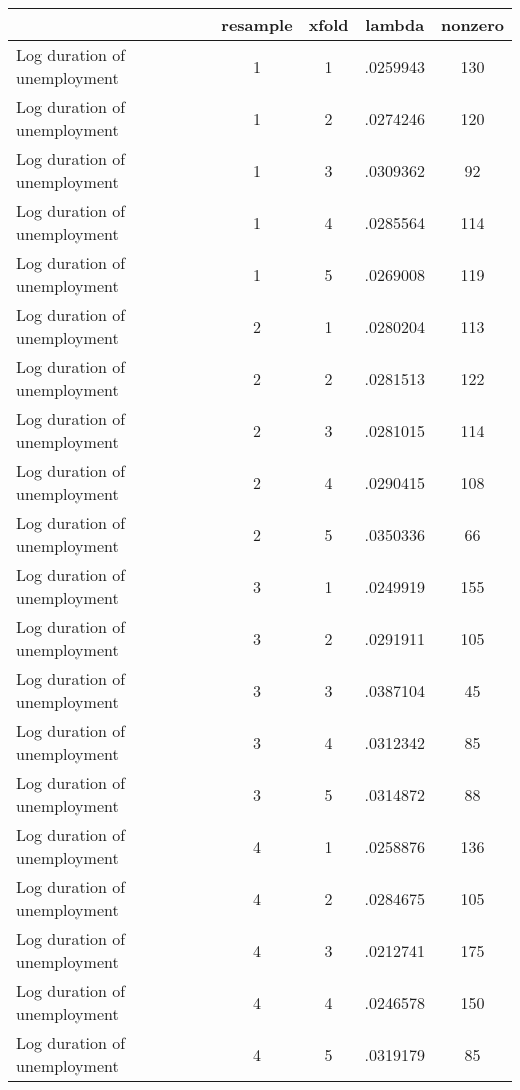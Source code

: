 \begin{tabular}{l*{4}{c}}
\hline\hline
                    &    resample&       xfold&      lambda&     nonzero\\
\hline
Log duration of unemployment&           1&           1&    .0259943&         130\\
Log duration of unemployment&           1&           2&    .0274246&         120\\
Log duration of unemployment&           1&           3&    .0309362&          92\\
Log duration of unemployment&           1&           4&    .0285564&         114\\
Log duration of unemployment&           1&           5&    .0269008&         119\\
Log duration of unemployment&           2&           1&    .0280204&         113\\
Log duration of unemployment&           2&           2&    .0281513&         122\\
Log duration of unemployment&           2&           3&    .0281015&         114\\
Log duration of unemployment&           2&           4&    .0290415&         108\\
Log duration of unemployment&           2&           5&    .0350336&          66\\
Log duration of unemployment&           3&           1&    .0249919&         155\\
Log duration of unemployment&           3&           2&    .0291911&         105\\
Log duration of unemployment&           3&           3&    .0387104&          45\\
Log duration of unemployment&           3&           4&    .0312342&          85\\
Log duration of unemployment&           3&           5&    .0314872&          88\\
Log duration of unemployment&           4&           1&    .0258876&         136\\
Log duration of unemployment&           4&           2&    .0284675&         105\\
Log duration of unemployment&           4&           3&    .0212741&         175\\
Log duration of unemployment&           4&           4&    .0246578&         150\\
Log duration of unemployment&           4&           5&    .0319179&          85\\

\end{tabular}
